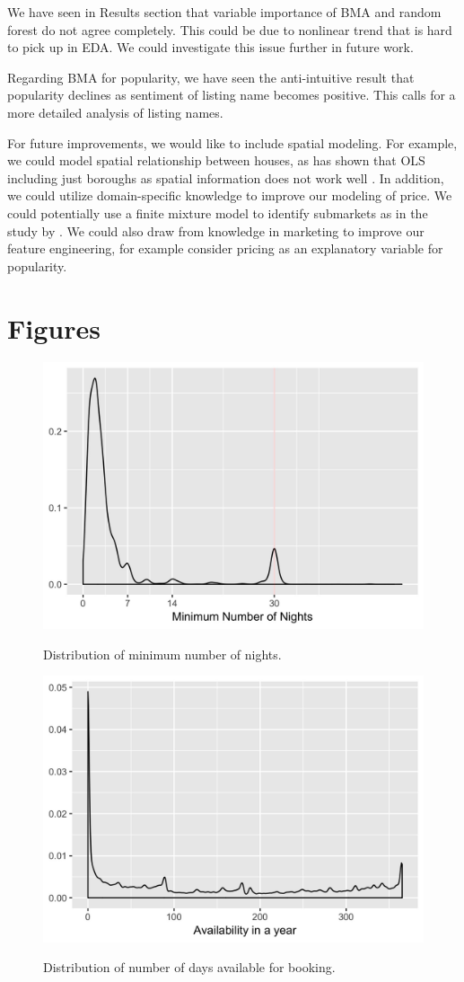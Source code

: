 \documentclass[10pt]{jmlr}%
\begin{document}
We have seen in Results section that variable importance of BMA and random forest do not agree completely. This could be due to nonlinear trend that is hard to pick up in EDA. We could investigate this issue further in future work.

Regarding BMA for popularity, we have seen the anti-intuitive result that popularity declines as sentiment of listing name becomes positive. This calls for a more detailed analysis of listing names.

For future improvements, we would like to include spatial modeling. For example, we could model spatial relationship between houses, as \cite{james2005apartment} has shown that OLS including just boroughs as spatial information does not work well . In addition, we could utilize domain-specific knowledge to improve our modeling of price. We could potentially use a finite mixture model to identify submarkets as in the study by \cite{belasco2012using}. We could also draw from knowledge in marketing to improve our feature engineering, for example consider pricing as an explanatory variable for popularity.





\newpage
\appendix

\section{Figures}
\label{appendix:fig}

\begin{figure}[htbp]
	\centering
	\caption{Distribution of minimum number of nights.}
	\includegraphics[width=0.5\linewidth]{length_stay_density.jpeg}
	\label{fig:length_stay_density}
\end{figure}

\begin{figure}[htbp]
	\centering
	\caption{Distribution of number of days available for booking.}
	\includegraphics[width=0.5\linewidth]{availability_density.jpeg}
	\label{fig:availability_density}
\end{figure}
\end{document}
